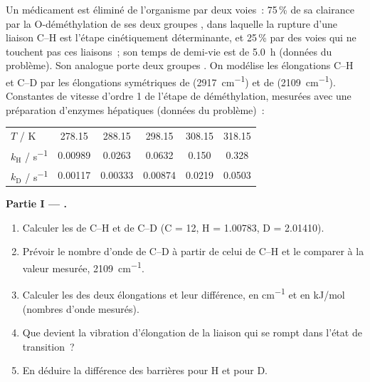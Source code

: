 \begin{problem}
\label{pb:b3:rate-theories:1}
Un médicament est éliminé de l'organisme par deux voies~: 75\,\% de sa
clairance par la O-déméthylation de ses deux groupes , dans
laquelle la rupture d'une liaison C--H est l'étape cinétiquement
déterminante, et 25\,\% par des voies qui ne touchent pas ces
liaisons~; son temps de demi-vie est de \qty{5.0}{h} (données du
problème). Son analogue porte deux groupes . On modélise les
élongations C--H et C--D par les élongations symétriques de 
(\qty{2917}{cm^{-1}}) et de  (\qty{2109}{cm^{-1}}). Constantes de
vitesse d'ordre 1 de l'étape de déméthylation, mesurées avec une
préparation d'enzymes hépatiques (données du problème)~:
\begin{center}\small
\begin{tabular}{lccccc}
\hline
$T$ / K & 278.15 & 288.15 & 298.15 & 308.15 & 318.15 \\
$k_{\mathrm H}$ / \unit{s^{-1}} & 0.00989 & 0.0263 & 0.0632 & 0.150 & 0.328 \\
$k_{\mathrm D}$ / \unit{s^{-1}} & 0.00117 & 0.00333 & 0.00874 & 0.0219 & 0.0503 \\ \hline
\end{tabular}
\end{center}

\medskip\noindent\textbf{Partie I --- .}
\begin{enumerate}
  \item Calculer les  de C--H et de C--D (C = 12,
        H = 1.00783,
        D = 2.01410).
  \item Prévoir le nombre d'onde de C--D à partir de celui de C--H et le
        comparer à la valeur mesurée, \qty{2109}{cm^{-1}}.
  \item Calculer les  des deux élongations et leur
        différence, en \unit{cm^{-1}} et en \unit{kJ/mol} (nombres d'onde
        mesurés).
  \item Que devient la vibration d'élongation de la liaison qui se rompt
        dans l'état de transition~?
  \item En déduire la différence des barrières pour H et pour D.
\end{enumerate}


\end{problem}
